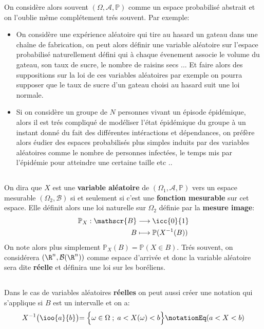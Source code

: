 On considère alors souvent \( ( \Omega, \mathscr{A}, \mathbb{P}) \) comme un espace probabilisé abstrait et on l'oublie même complétement trés souvent. Par exemple:
\begin{itemize}
   \item On considère une expérience aléatoire qui tire au hasard un gateau dans une chaîne de fabrication, on peut alors définir une variable aléatoire sur l'espace probabilisé naturellement défini qui à chaque évenement associe le volume du gateau, son taux de sucre, le nombre de raisins secs ... Et faire alors des suppositions sur la loi de ces variables aléatoires par exemple on pourra supposer que le taux de sucre d'un gateau choisi au hasard suit une loi normale.
   \item Si on considère un groupe de \( N \) personnes vivant un épisode épidémique, alors il est trés compliqué de modéliser l'état épidémique du groupe à un instant donné du fait des différentes intéractions et dépendances, on préfère alors éudier des espaces probabilisés plus simples induits par des variables aléatoires comme le nombre de personnes infectées, le temps mis par l'épidémie pour atteindre une certaine taille etc ..
\end{itemize}
\subsection*{}
On dira que \( X \) est une \textbf{variable aléatoire} de \( ( \Omega_1, \mathscr{A}, \mathbb{P}) \) vers un espace mesurable \( ( \Omega_2, \mathscr{B}) \) si et seulement si c'est une \textbf{fonction mesurable} sur cet espace. Elle définit alors une loi naturelle sur \( \Omega_2 \) définie par la \textbf{mesure image}:
\[
   \begin{aligned}
      \mathbb{P}_X: \mathscr{B} &\longrightarrow \icc{0}{1}\\
      B &\longmapsto \mathbb{P}(X^{-1}(B))
   \end{aligned}
\]
On note alors plus simplement \( \mathbb{P}_X(B) = \mathbb{P}(X \in B) \). Trés souvent, on considérera \( (\R^n, \mathcal{B}( \R^n)) \) comme espace d'arrivée et donc la variable aléatoire sera dite \textbf{réelle} et définira une loi sur les boréliens.
\subsection*{}
Dans le cas de variables aléatoires \textbf{réelles} on peut aussi créer une notation qui s'applique si \(B\) est un intervalle et on a:
\[
   X^{-1}\bigl(\ioo{a}{b}\bigl) = \Bigl\{ \omega \in \Omega \; ; \;  a < X(\omega) < b\Bigl\} \notationEq (a < X < b)
\]
